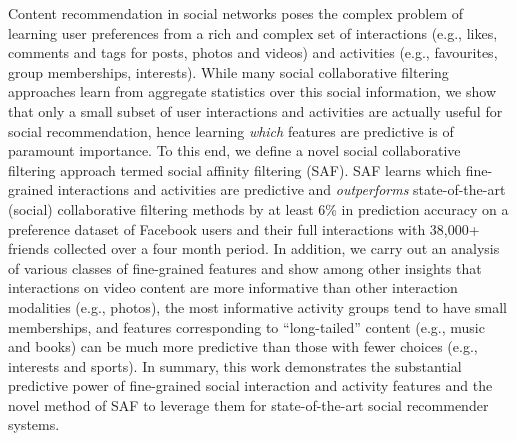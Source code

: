 %

Content recommendation in social networks poses the complex problem of
learning user preferences from a rich and complex set of interactions
(e.g., likes, comments and tags for posts, photos and videos) and
activities (e.g., favourites, group memberships, interests).  While
many social collaborative filtering approaches learn from aggregate
statistics over this social information, we show that only a small
subset of user interactions and activities are actually useful for
social recommendation, hence learning \emph{which} features are
predictive is of paramount importance.  To this end, we define a novel
social collaborative filtering approach termed social affinity
filtering (SAF).  SAF learns which fine-grained interactions and
activities are predictive and \emph{outperforms} state-of-the-art (social)
collaborative filtering methods by at least 6\% in prediction accuracy on a
preference dataset of Facebook users and their full interactions
with 38,000+ friends collected over a four month period.  In addition,
we carry out an analysis of various classes of fine-grained
features and show among other insights that interactions on video
content are more informative than other interaction modalities (e.g.,
photos), the most informative activity groups tend to have small
memberships, and features corresponding to ``long-tailed'' content
(e.g., music and books) can be much more predictive than those
with fewer choices (e.g., interests and sports).
In summary, this work demonstrates the substantial predictive power of
fine-grained social interaction and activity features and the novel
method of SAF to leverage them for state-of-the-art social recommender
systems.

